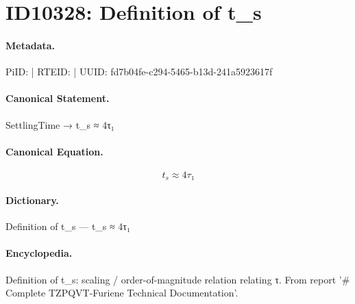 \section*{ID10328: Definition of t\_s}
\paragraph{Metadata.}
PiID:  | RTEID:  | UUID: fd7b04fe-c294-5465-b13d-241a5923617f

\paragraph{Canonical Statement.}
SettlingTime → t\_s ≈ 4τ₁

\paragraph{Canonical Equation.}
\[
t_s ≈ 4τ₁
\]

\paragraph{Dictionary.}
Definition of t\_s — t\_s ≈ 4τ₁

\paragraph{Encyclopedia.}
Definition of t\_s: scaling / order-of-magnitude relation relating τ. From report '\# Complete TZPQVT-Furiene Technical Documentation'.
